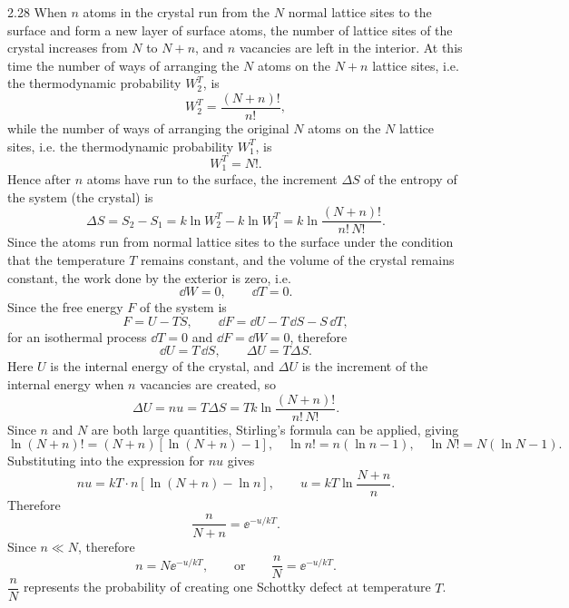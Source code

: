 \begin{solution}{2.28}
When $n$ atoms in the crystal run from the $N$ normal lattice sites to the surface and form a new
layer of surface atoms, the number of lattice sites of the crystal increases from $N$ to $N+n$,
and $n$ vacancies are left in the interior. At this time the number of ways of arranging the $N$
atoms on the $N+n$ lattice sites, i.e. the thermodynamic probability $W_2^T$, is
\begin{equation*}
W_2^T = \frac{(N+n)!}{n!},
\end{equation*}
while the number of ways of arranging the original $N$ atoms on the $N$ lattice sites, i.e. the
thermodynamic probability $W_1^T$, is
\begin{equation*}
W_1^T = N! .
\end{equation*}
Hence after $n$ atoms have run to the surface, the increment $\Delta S$ of the entropy of the
system (the crystal) is
\begin{equation*}
\Delta S = S_2-S_1 = k\ln W_2^T - k\ln W_1^T = k\ln\frac{(N+n)!}{n!\,N!}.
\end{equation*}
Since the atoms run from normal lattice sites to the surface under the condition that the
temperature $T$ remains constant, and the volume of the crystal remains constant, the work done
by the exterior is zero, i.e.
\begin{equation*}
\dd W = 0,\qquad \dd T = 0 .
\end{equation*}
Since the free energy $F$ of the system is
\begin{equation*}
F = U-TS,\qquad \dd F = \dd U - T\,\dd S - S\,\dd T,
\end{equation*}
for an isothermal process $\dd T=0$ and $\dd F=\dd W=0$, therefore
\begin{equation*}
\dd U = T\,\dd S,\qquad \Delta U = T\Delta S .
\end{equation*}
Here $U$ is the internal energy of the crystal, and $\Delta U$ is the increment of the internal
energy when $n$ vacancies are created, so
\begin{equation*}
\Delta U = nu = T\Delta S = Tk\ln\frac{(N+n)!}{n!\,N!}.
\end{equation*}
Since $n$ and $N$ are both large quantities, Stirling's formula can be applied, giving
\begin{equation*}
\ln(N+n)! = (N+n)\left[\ln(N+n)-1\right],\quad
\ln n! = n\left(\ln n-1\right),\quad
\ln N! = N\left(\ln N-1\right).
\end{equation*}
Substituting into the expression for $nu$ gives
\begin{equation*}
nu = kT\cdot n\left[\ln(N+n)-\ln n\right],\qquad
u = kT\ln\frac{N+n}{n}.
\end{equation*}
Therefore
\begin{equation*}
\frac{n}{N+n} = \ee^{-u/kT}.
\end{equation*}
Since $n\ll N$, therefore
\begin{equation*}
n = N\ee^{-u/kT},\qquad\text{or}\qquad \frac{n}{N} = \ee^{-u/kT}.
\end{equation*}
$\dfrac{n}{N}$ represents the probability of creating one Schottky defect at temperature $T$.
\end{solution}

